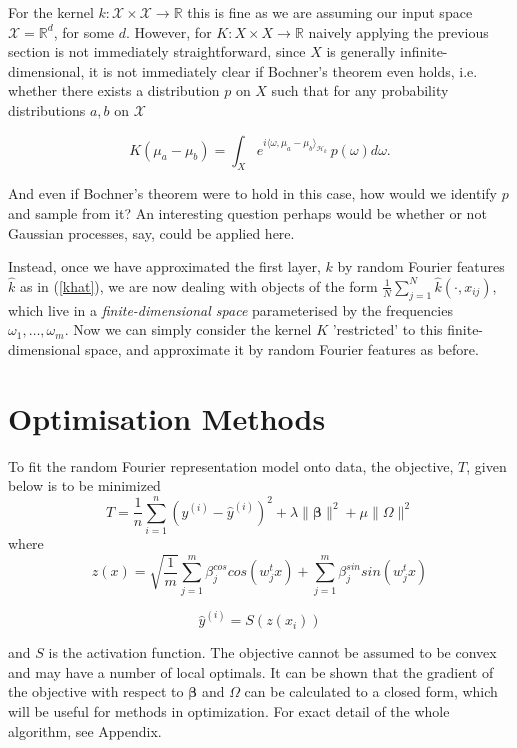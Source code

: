 \documentclass{article} %
\newcommand{\vectGreek}[1]{\boldsymbol{#1}}
\newcommand{\matr}[1]{\mathsf{#1}}
\begin{document}
For the kernel $k: \mathcal{X}\times\mathcal{X}\rightarrow\mathbb{R}$ this is fine as we are assuming our input space $\mathcal{X}=\mathbb{R}^d$, for some $d$. However, for $K: X \times X\rightarrow\mathbb{R}$ naively applying the previous section is not immediately straightforward, since $X$ is generally infinite-dimensional, it is not immediately clear if Bochner's theorem even holds, i.e. whether there exists a distribution $p$ on $X$ such that for any probability distributions $a,b$ on $\mathcal{X}$

$$K(\mu_a - \mu_b)=\int_X e^{i \langle\omega ,\mu_a - \mu_b \rangle_{\mathcal{H}_k}}\, p(\omega) d\omega.$$

And even if Bochner's theorem were to hold in this case, how would we identify $p$ and sample from it? An interesting question perhaps would be whether or not Gaussian processes, say, could be applied here.

Instead, once we have approximated the first layer, $k$ by random Fourier features $\hat{k}$ as in (\ref{khat}), we are now dealing with objects of the form $\frac{1}{N} \sum_{j=1}^N \hat{k}(\cdot,x_{ij})$, which live in a \textit{finite-dimensional space} parameterised by the frequencies $\omega_1,\dots,\omega_m$. Now we can simply consider the kernel $K$ 'restricted' to this finite-dimensional space, and approximate it by random Fourier features as before.

\section{Optimisation Methods }

To fit the random Fourier representation model onto data, the objective, $T$, given below is to be minimized
\begin{equation}\label{loss}
T=\frac{1}{n}\sum_{i=1}^{n}
\left(
	y^{(i)}-\hat{y}^{(i)}
\right)^2
+\lambda\|\vectGreek{\beta}\|^2
+\mu\|\matr{\Omega}\|^2
\end{equation}
where
\begin{equation} \label{transf_x}
z(x) = \sqrt{ \frac{1}{m}} \sum_{j=1}^{m} \beta_{j}^{cos} cos( w_{j}^{t} x ) + \sum_{j=1}^{m} \beta_{j}^{sin} sin( w_{j}^{t} x )
\end{equation}

\begin{equation}\label{pred_y}
\hat{y}^{(i)}=S( z (x_{i} ))
\end{equation}

and $S$ is the activation function. The objective cannot be assumed to be convex and may have a number of local optimals. It can be shown that the gradient of the objective with respect to $\vectGreek{\beta}$ and $\matr{\Omega}$ can be calculated to a closed form, which will be useful for methods in optimization. For exact detail of the whole algorithm, see Appendix.
\end{document}
